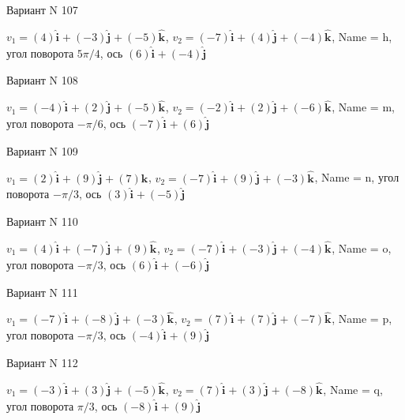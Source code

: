 \documentclass[11pt]{report}
\begin{document}
Вариант N 107

$v_1 = \left(4\right)\mathbf{\hat{i}_{}} + \left(-3\right)\mathbf{\hat{j}_{}} + \left(-5\right)\mathbf{\hat{k}_{}}$, $v_2 = \left(-7\right)\mathbf{\hat{i}_{}} + \left(4\right)\mathbf{\hat{j}_{}} + \left(-4\right)\mathbf{\hat{k}_{}}$, Name = h, угол поворота $5 \pi / 4$, ось $\left(6\right)\mathbf{\hat{i}_{}} + \left(-4\right)\mathbf{\hat{j}_{}}$

Вариант N 108

$v_1 = \left(-4\right)\mathbf{\hat{i}_{}} + \left(2\right)\mathbf{\hat{j}_{}} + \left(-5\right)\mathbf{\hat{k}_{}}$, $v_2 = \left(-2\right)\mathbf{\hat{i}_{}} + \left(2\right)\mathbf{\hat{j}_{}} + \left(-6\right)\mathbf{\hat{k}_{}}$, Name = m, угол поворота $- \pi / 6$, ось $\left(-7\right)\mathbf{\hat{i}_{}} + \left(6\right)\mathbf{\hat{j}_{}}$

Вариант N 109

$v_1 = \left(2\right)\mathbf{\hat{i}_{}} + \left(9\right)\mathbf{\hat{j}_{}} + \left(7\right)\mathbf{\hat{k}_{}}$, $v_2 = \left(-7\right)\mathbf{\hat{i}_{}} + \left(9\right)\mathbf{\hat{j}_{}} + \left(-3\right)\mathbf{\hat{k}_{}}$, Name = n, угол поворота $- \pi / 3$, ось $\left(3\right)\mathbf{\hat{i}_{}} + \left(-5\right)\mathbf{\hat{j}_{}}$

Вариант N 110

$v_1 = \left(4\right)\mathbf{\hat{i}_{}} + \left(-7\right)\mathbf{\hat{j}_{}} + \left(9\right)\mathbf{\hat{k}_{}}$, $v_2 = \left(-7\right)\mathbf{\hat{i}_{}} + \left(-3\right)\mathbf{\hat{j}_{}} + \left(-4\right)\mathbf{\hat{k}_{}}$, Name = o, угол поворота $- \pi / 3$, ось $\left(6\right)\mathbf{\hat{i}_{}} + \left(-6\right)\mathbf{\hat{j}_{}}$

Вариант N 111

$v_1 = \left(-7\right)\mathbf{\hat{i}_{}} + \left(-8\right)\mathbf{\hat{j}_{}} + \left(-3\right)\mathbf{\hat{k}_{}}$, $v_2 = \left(7\right)\mathbf{\hat{i}_{}} + \left(7\right)\mathbf{\hat{j}_{}} + \left(-7\right)\mathbf{\hat{k}_{}}$, Name = p, угол поворота $- \pi / 3$, ось $\left(-4\right)\mathbf{\hat{i}_{}} + \left(9\right)\mathbf{\hat{j}_{}}$

Вариант N 112

$v_1 = \left(-3\right)\mathbf{\hat{i}_{}} + \left(3\right)\mathbf{\hat{j}_{}} + \left(-5\right)\mathbf{\hat{k}_{}}$, $v_2 = \left(7\right)\mathbf{\hat{i}_{}} + \left(3\right)\mathbf{\hat{j}_{}} + \left(-8\right)\mathbf{\hat{k}_{}}$, Name = q, угол поворота $\pi / 3$, ось $\left(-8\right)\mathbf{\hat{i}_{}} + \left(9\right)\mathbf{\hat{j}_{}}$
\end{document}
